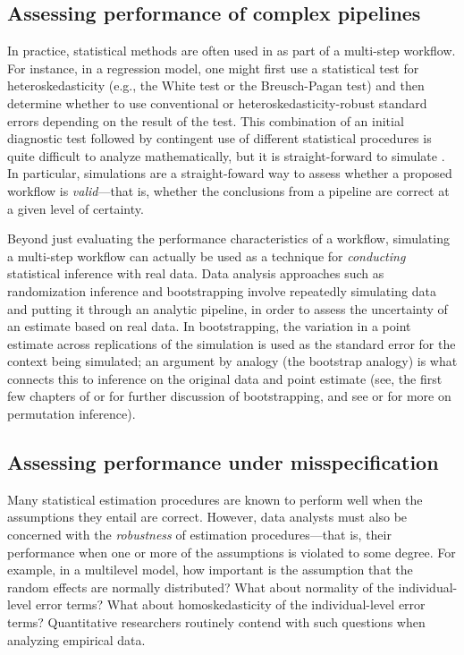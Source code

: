 \documentclass[
]{book}
\begin{document}
\subsection{Assessing performance of complex pipelines}\label{assessing-performance-of-complex-pipelines}

In practice, statistical methods are often used in as part of a multi-step workflow.
For instance, in a regression model, one might first use a statistical test for heteroskedasticity (e.g., the White test or the Breusch-Pagan test) and then determine whether to use conventional or heteroskedasticity-robust standard errors depending on the result of the test.
This combination of an initial diagnostic test followed by contingent use of different statistical procedures is quite difficult to analyze mathematically, but it is straight-forward to simulate \citep[see, for example,][]{longUsingHeteroscedasticityConsistent2000}.
In particular, simulations are a straight-foward way to assess whether a proposed workflow is \emph{valid}---that is, whether the conclusions from a pipeline are correct at a given level of certainty.

Beyond just evaluating the performance characteristics of a workflow, simulating a multi-step workflow can actually be used as a technique for \emph{conducting} statistical inference with real data.
Data analysis approaches such as randomization inference and bootstrapping involve repeatedly simulating data and putting it through an analytic pipeline, in order to assess the uncertainty of an estimate based on real data.
In bootstrapping, the variation in a point estimate across replications of the simulation is used as the standard error for the context being simulated;
an argument by analogy (the bootstrap analogy) is what connects this to inference on the original data and point estimate (see, the first few chapters of \citet{davison1997BootstrapMethodsTheir} or \citet{efron2000BootstrapModernStatistics} for further discussion of bootstrapping, and see \citet{good2013permutation} or \citet{lehmann1975statistical} for more on permutation inference).

\subsection{Assessing performance under misspecification}\label{assessing-performance-under-misspecification}

Many statistical estimation procedures are known to perform well when the assumptions they entail are correct.
However, data analysts must also be concerned with the \emph{robustness} of estimation procedures---that is, their performance when one or more of the assumptions is violated to some degree.
For example, in a multilevel model, how important is the assumption that the random effects are normally distributed? What about normality of the individual-level error terms? What about homoskedasticity of the individual-level error terms?
Quantitative researchers routinely contend with such questions when analyzing empirical data.
\end{document}
